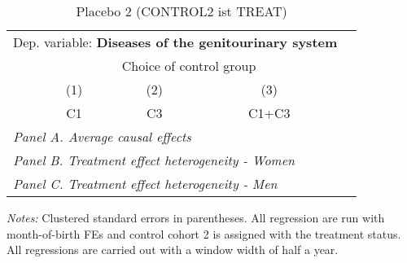  \begin{table}[H] \centering \begin{threeparttable} \caption{Placebo 2 (CONTROL2 ist TREAT) } {\def\sym#1{\ifmmode^{#1}\else\(^{#1}\)\fi} \begin{tabular}{l*{4}{c}} \toprule \multicolumn{4}{l}{Dep. variable: \textbf{Diseases of the genitourinary system}} \\ & \multicolumn{3}{c}{Choice of control group} \\ \cmidrule(lr){2-4}
            &\multicolumn{1}{c}{(1)}&\multicolumn{1}{c}{(2)}&\multicolumn{1}{c}{(3)}\\
            &\multicolumn{1}{c}{C1}&\multicolumn{1}{c}{C3}&\multicolumn{1}{c}{C1+C3}\\
\midrule
 \multicolumn{4}{l}{\emph{Panel A. Average causal effects}} \\      \midrule\multicolumn{4}{l}{\emph{Panel B. Treatment effect heterogeneity - Women}} \\      \midrule\multicolumn{4}{l}{\emph{Panel C. Treatment effect heterogeneity - Men}} \\      
\bottomrule \end{tabular} } \begin{tablenotes} \item \scriptsize \emph{Notes:} Clustered standard errors in parentheses. All regression are run with month-of-birth FEs and control cohort 2 is assigned with the treatment status. All regressions are carried out with a window width of half a year. \end{tablenotes} \end{threeparttable} \end{table} 

